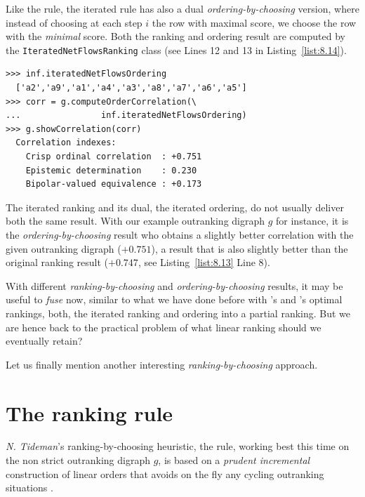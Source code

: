 Like the \Kohler rule, the iterated \NetFlows rule has also a dual \emph{ordering-by-choosing} version, where instead of choosing at each step $i$ the row with maximal \NetFlows score, we choose the row with the \emph{minimal} \NetFlows score. Both the ranking and ordering result are computed by the \texttt{IteratedNetFlowsRanking} class (see Lines 12 and 13 in Listing~\vref{list:8.14}).
\begin{lstlisting}
>>> inf.iteratedNetFlowsOrdering
  ['a2','a9','a1','a4','a3','a8','a7','a6','a5']
>>> corr = g.computeOrderCorrelation(\
...                inf.iteratedNetFlowsOrdering)
>>> g.showCorrelation(corr)
  Correlation indexes:
    Crisp ordinal correlation  : +0.751
    Epistemic determination    : 0.230
    Bipolar-valued equivalence : +0.173
\end{lstlisting}

The iterated \NetFlows ranking and its dual, the iterated \NetFlows ordering, do not usually deliver both the same result. With our example outranking digraph $g$ for instance, it is the \emph{ordering-by-choosing} result who obtains a slightly better correlation with the given outranking digraph ($+0.751$), a result that is also slightly better than the original \Kohler ranking result ($+0.747$, see Listing~\vref{list:8.13} Line 8).

With different \emph{ranking-by-choosing} and \emph{ordering-by-choosing} results, it may be useful to \emph{fuse} now, similar to what we have done before with \Kemeny 's and \Slater 's optimal rankings, both, the iterated \NetFlows ranking and ordering into a partial ranking. But we are hence back to the practical problem of what linear ranking should we eventually retain? 

Let us finally mention another interesting \emph{ranking-by-choosing} approach.

\section{The \RankedPairs ranking rule}
\label{sec:8.7}

\emph{N. Tideman}'s  ranking-by-choosing heuristic, the \RankedPairs rule, working best this time on the non strict outranking digraph $g$, is based on a \emph{prudent incremental} construction of linear orders that avoids on the fly any cycling outranking situations \citep{TID-1987}.

